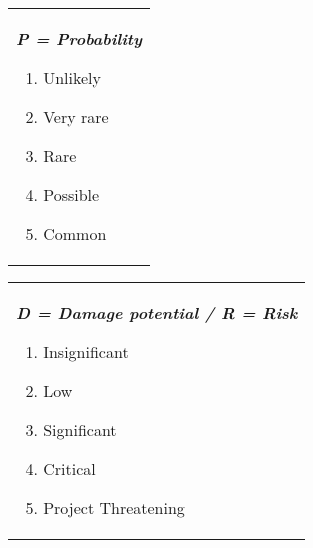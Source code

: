 \begin{tabular}[t]{@{}>{\raggedright\arraybackslash}p{}}
  \textbf{\textit{P = Probability}}
  \begin{enumerate}[topsep=0pt,itemsep=-2pt,leftmargin=13pt]
  \item Unlikely
  \item Very rare
  \item Rare
  \item Possible
  \item Common
  \end{enumerate}
\end{tabular}
\begin{tabular}[t]{@{}>{\raggedright\arraybackslash}p{}@{}}
  \textbf{\textit{D = Damage potential  / R = Risk}}
  \begin{enumerate}[topsep=0pt,itemsep=-2pt,leftmargin=13pt]
  \item Insignificant
  \item Low
  \item Significant
  \item Critical
  \item Project Threatening 
  \end{enumerate}
\end{tabular}

